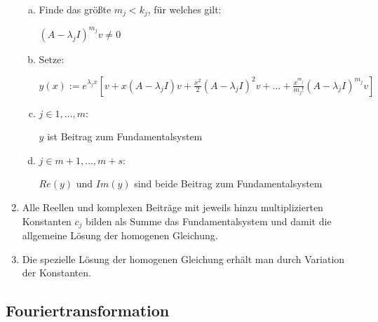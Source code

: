 \documentclass[twoside]{article}
\begin{document}
\begin{enumerate}[1.]
						\begin{enumerate}[a)]
							\item Finde das größte \begin{math} m_j < k_j \end{math}, für welches gilt:
								
								\begin{math}
									(A-\lambda_j I)^{m_j} v \ne 0
								\end{math}
								
							\item Setze:
							
								\begin{math}
									y(x) := e^{\lambda_j x}[v + x(A - \lambda_j I) v + \frac{x^2}{2}(A-\lambda_j I)^2 v + \dots + \frac{x^{m_j}}{m_j!}(A-\lambda_j I)^{m_j}v]
								\end{math}
							
							\item \begin{math} j \in {1,\dots, m} \end{math}:
							
								\begin{math} y \end{math} ist Beitrag zum Fundamentalsystem
								
							\item \begin{math} j \in {m+1, \dots, m+s} \end{math}:
							
								\begin{math} Re(y) \end{math} und \begin{math} Im(y) \end{math} sind beide Beitrag zum Fundamentalsystem
						\end{enumerate}
					
					\item Alle Reellen und komplexen Beiträge mit jeweils hinzu multiplizierten Konstanten \begin{math} c_j \end{math} bilden als Summe das Fundamentalsystem und damit die allgemeine Lösung der homogenen Gleichung.
					
					\item Die spezielle Lösung der homogenen Gleichung erhält man durch Variation der Konstanten.
				\end{enumerate}
				
		\subsection{Fouriertransformation}
			
\end{document}
